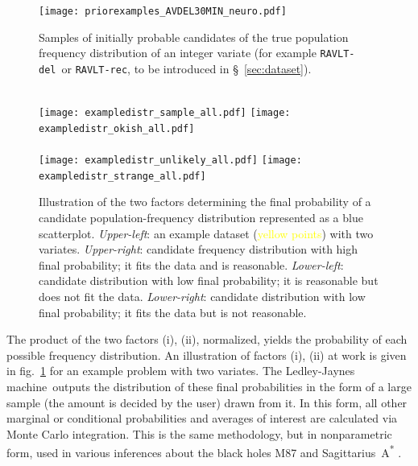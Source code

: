 \documentclass[utf8]{FrontiersinHarvard} %
\newcommand*{\sect}{\S}%
\newcommand*{\fig}{fig.}%
\renewcommand*{\|}[1][]{\nonscript\:#1\vert\nonscript\:\mathopen{}}
\newcommand*{\ravltdel}{\texttt{RAVLT-del}}
\newcommand*{\ravltrec}{\texttt{RAVLT-rec}}
\newcommand*{\ljm}{Ledley-Jaynes machine}
\begin{document}
\begin{subfigure}[t]\setcounter{subfigure}{0}
  \centering%
  \begin{minipage}[c]{0.39\linewidth}\centering
    \texttt{[image: priorexamples\_AVDEL30MIN\_neuro.pdf]}
  \caption{Samples of initially probable candidates of the true population frequency distribution of an integer variate (for example \ravltdel\ or \ravltrec, to be introduced in \sect~\ref{sec:dataset}).}\label{fig:prior_distribution}
  \end{minipage}\hfill
  \begin{minipage}[c]{0.59\linewidth}\centering%
%
\hfill%
%
\\[-1em]
\texttt{[image: exampledistr\_sample\_all.pdf]}%
\hfill%
\texttt{[image: exampledistr\_okish\_all.pdf]}%
\\
%
\hfill%
%
\\[-1em]
  \texttt{[image: exampledistr\_unlikely\_all.pdf]}
  \hfill
  \texttt{[image: exampledistr\_strange\_all.pdf]}
  \caption{Illustration of the two factors determining the final probability of a candidate population-frequency distribution represented as a \textcolor{bluepurple}{blue scatterplot}. \emph{Upper-left}: an example dataset (\textcolor{yellow}{yellow points}) with two variates. \emph{Upper-right}: candidate frequency distribution with high final probability; it fits the data and is reasonable. \emph{Lower-left}: candidate distribution with low final probability; it is reasonable but does not fit the data. \emph{Lower-right}: candidate distribution with low final probability; it fits the data but is not reasonable.}\label{fig:inferring_distribution}
  \end{minipage}
\end{subfigure}%


The product of the two factors (i), (ii), normalized, yields the probability of each possible frequency distribution. An illustration of factors (i), (ii) at work is given in \fig~\ref{fig:inferring_distribution} for an example problem with two variates. The \ljm\ outputs the distribution of these final probabilities in the form of a large sample (the amount is decided by the user) drawn from it. In this form, all other marginal or conditional probabilities and averages of interest are calculated via Monte Carlo integration. This is the same methodology, but in nonparametric form, used in various inferences about the black holes M87 and Sagittarius~A\textsuperscript{*} \citep{eht2019,eht2022}.
\end{document}
